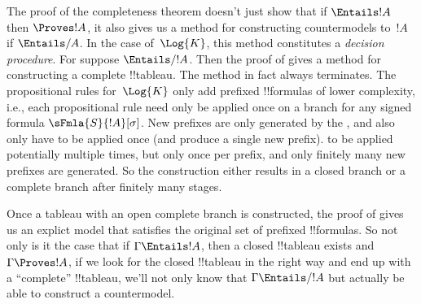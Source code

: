 \documentclass[../../../include/open-logic-section]{subfiles}
\begin{document}

\begin{explain}
  The proof of the completeness theorem doesn't just show that if
  $\Entails !A$ then $\Proves !A$, it also gives us a method for
  constructing countermodels to~$!A$ if $\Entails/ A$. In the case
  of~$\Log{K}$, this method constitutes a \emph{decision
    procedure}. For suppose $\Entails/ !A$. Then the proof of
   gives a method for constructing a
  complete !!{tableau}. The method in fact always terminates. The
  propositional rules for~$\Log{K}$ only add prefixed !!{formula}s of
  lower complexity, i.e., each propositional rule need only be applied
  once on a branch for any signed formula $\sFmla{S}{!A}[\sigma]$. New
  prefixes are only generated by the
  , and also only have to
  be applied once (and produce a single new prefix).
   to be applied potentially
  multiple times, but only once per prefix, and only finitely many new
  prefixes are generated. So the construction either results in a
  closed branch or a complete branch after finitely many stages.

  Once a tableau with an open complete branch is constructed, the
  proof of  gives us an explict model
  that satisfies the original set of prefixed !!{formula}s. So not
  only is it the case that if $\Gamma \Entails !A$, then a closed
  !!{tableau} exists and $\Gamma \Proves !A$, if we look for the
  closed !!{tableau} in the right way and end up with a ``complete''
  !!{tableau}, we'll not only know that $\Gamma \Entails/ !A$ but
  actually be able to construct a countermodel.
\end{explain}
\end{document}
